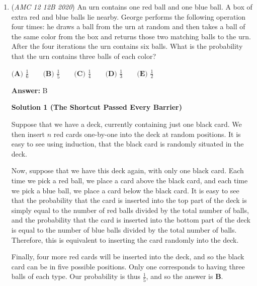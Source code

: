 \begin{enumerate}
 Case 4: $5$ diameters

 There is only $\boxed{\textbf{1}}$ way to do this.

 Thus, in total there are $2+5+5+1=\boxed{\textbf{(C) }13}$ possible ways.

 Definetly go check it out!

 


	\item (\textit{AMC 12 12B 2020}) An urn contains one red ball and one blue ball. A box of extra red and blue balls lie nearby. George performs the following operation four times: he draws a ball from the urn at random and then takes a ball of the same color from the box and returns those two matching balls to the urn. After the four iterations the urn contains six balls. What is the probability that the urn contains three balls of each color?


 $\textbf{(A) } \frac16 \qquad \textbf{(B) }\frac15 \qquad \textbf{(C) } \frac14 \qquad \textbf{(D) } \frac13 \qquad \textbf{(E) } \frac12$

 \textbf{Answer: }B



\textbf{Solution 1 (The Shortcut Passed Every Barrier)}

Suppose that we have a deck, currently containing just one black card. We then insert $n$ red cards one-by-one into the deck at random positions. It is easy to see using induction, that the black card is randomly situated in the deck. 

 Now, suppose that we have this deck again, with only one black card. Each time we pick a red ball, we place a card above the black card, and each time we pick a blue ball, we place a card below the black card. It is easy to see that the probability that the card is inserted into the top part of the deck is simply equal to the number of red balls divided by the total number of balls, and the probability that the card is inserted into the bottom part of the deck is equal to the number of blue balls divided by the total number of balls. Therefore, this is equivalent to inserting the card randomly into the deck.

 Finally, four more red cards will be inserted into the deck, and so the black card can be in five possible positions. Only one corresponds to having three balls of each type. Our probability is thus $\frac{1}{5}$, and so the answer is $\boxed{\textbf{B}}$.

 




\end{enumerate}

